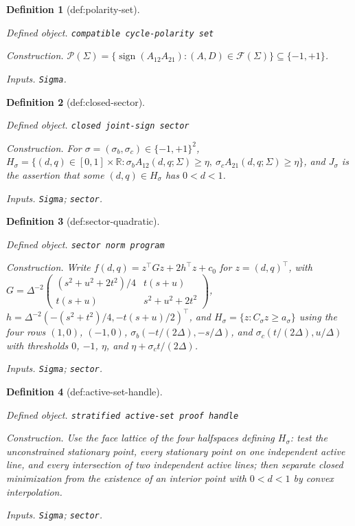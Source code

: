 \documentclass{article}
\newtheorem{definition}{Definition}
\begin{document}
\begin{definition}[def:polarity-set]\label{def:polarity-set}
\par\smallskip\noindent\emph{Defined object.} \texttt{compatible cycle-\allowbreak{}polarity set}
\par\smallskip\noindent\emph{Construction.} \(\mathcal P(\Sigma)=\{\operatorname{sign}(A_{12}A_{21}):(A,D)\in\mathcal F(\Sigma)\}\subseteq\{-1,+1\}\).
\par\smallskip\noindent\emph{Inputs.} \texttt{Sigma}.
\end{definition}

\begin{definition}[def:closed-sector]\label{def:closed-sector}
\par\smallskip\noindent\emph{Defined object.} \texttt{closed joint-\allowbreak{}sign sector}
\par\smallskip\noindent\emph{Construction.} For \(\sigma=(\sigma_b,\sigma_c)\in\{-1,+1\}^2\), \(H_{\sigma}=\{(d,q)\in[0,1]\times\mathbb R:\sigma_bA_{12}(d,q;\Sigma)\ge\eta,\ \sigma_cA_{21}(d,q;\Sigma)\ge\eta\}\), and \(J_{\sigma}\) is the assertion that some \((d,q)\in H_{\sigma}\) has \(0<d<1\).
\par\smallskip\noindent\emph{Inputs.} \texttt{Sigma}; \texttt{sector}.
\end{definition}

\begin{definition}[def:sector-quadratic]\label{def:sector-quadratic}
\par\smallskip\noindent\emph{Defined object.} \texttt{sector norm program}
\par\smallskip\noindent\emph{Construction.} Write \(f(d,q)=z^{\top}Gz+2h^{\top}z+c_0\) for \(z=(d,q)^{\top}\), with \(G=\Delta^{-2}\begin{pmatrix}(s^2+u^2+2t^2)/4&t(s+u)\\t(s+u)&s^2+u^2+2t^2\end{pmatrix}\), \(h=\Delta^{-2}(-(s^2+t^2)/4,-t(s+u)/2)^{\top}\), and \(H_{\sigma}=\{z:C_{\sigma}z\ge a_{\sigma}\}\) using the four rows \((1,0)\), \((-1,0)\), \(\sigma_b(-t/(2\Delta),-s/\Delta)\), and \(\sigma_c(t/(2\Delta),u/\Delta)\) with thresholds \(0\), \(-1\), \(\eta\), and \(\eta+\sigma_ct/(2\Delta)\).
\par\smallskip\noindent\emph{Inputs.} \texttt{Sigma}; \texttt{sector}.
\end{definition}

\begin{definition}[def:active-set-handle]\label{def:active-set-handle}
\par\smallskip\noindent\emph{Defined object.} \texttt{stratified active-\allowbreak{}set proof handle}
\par\smallskip\noindent\emph{Construction.} Use the face lattice of the four halfspaces defining \(H_{\sigma}\): test the unconstrained stationary point, every stationary point on one independent active line, and every intersection of two independent active lines; then separate closed minimization from the existence of an interior point with \(0<d<1\) by convex interpolation.
\par\smallskip\noindent\emph{Inputs.} \texttt{Sigma}; \texttt{sector}.
\end{definition}
\end{document}
